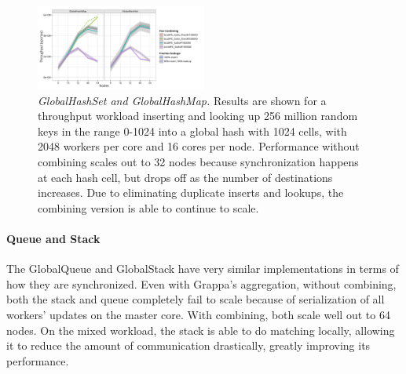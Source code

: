 \begin{figure}[t]
  \centering
  \includegraphics[width=0.5\textwidth]{data/plots/hash_perf.pdf}
  \caption{\emph{GlobalHashSet and GlobalHashMap.}
    Results are shown for a throughput workload inserting and looking up 256 million random keys in the range 0-1024 into a global hash with 1024 cells, with 2048 workers per core and 16 cores per node.
    Performance without combining scales out to 32 nodes because synchronization happens at each hash cell, but drops off as the number of destinations increases. Due to eliminating duplicate inserts and lookups, the combining version is able to continue to scale.}
  \label{fig:hash_perf}
\end{figure}

\paragraph{Queue and Stack}
The GlobalQueue and GlobalStack have very similar implementations in terms of how they are synchronized. Even with Grappa's aggregation, without combining, both the stack and queue completely fail to scale because of serialization of all workers' updates on the master core.
With combining, both scale well out to 64 nodes.
On the mixed workload, the stack is able to do matching locally, allowing it to reduce the amount of communication drastically, greatly improving its performance.

